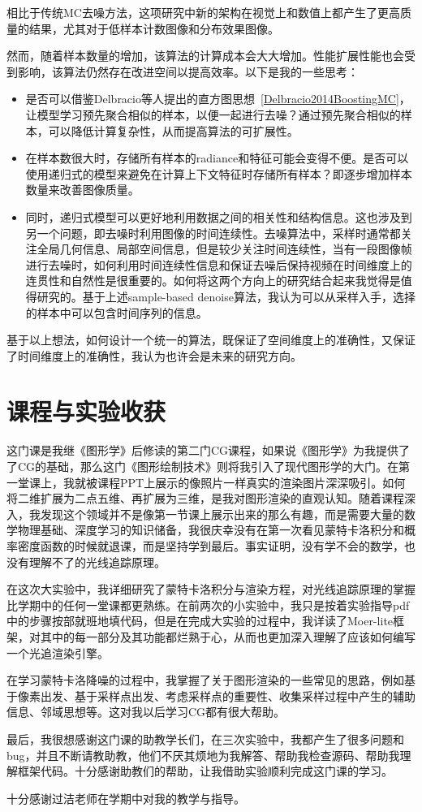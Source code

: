 \documentclass[lang=cn,10pt]{elegantbook}
\begin{document}
相比于传统MC去噪方法，这项研究中新的架构在视觉上和数值上都产生了更高质量的结果，尤其对于低样本计数图像和分布效果图像。

然而，随着样本数量的增加，该算法的计算成本会大大增加。性能扩展性能也会受到影响，该算法仍然存在改进空间以提高效率。以下是我的一些思考：

\begin{itemize}

\item 是否可以借鉴Delbracio等人提出的直方图思想~\ref{Delbracio2014BoostingMC}，让模型学习预先聚合相似的样本，以便一起进行去噪？通过预先聚合相似的样本，可以降低计算复杂性，从而提高算法的可扩展性。

\item 在样本数很大时，存储所有样本的radiance和特征可能会变得不便。是否可以使用递归式的模型来避免在计算上下文特征时存储所有样本？即逐步增加样本数量来改善图像质量。

\item 同时，递归式模型可以更好地利用数据之间的相关性和结构信息。这也涉及到另一个问题，即去噪时利用图像的时间连续性。去噪算法中，采样时通常都关注全局几何信息、局部空间信息，但是较少关注时间连续性，当有一段图像帧进行去噪时，如何利用时间连续性信息和保证去噪后保持视频在时间维度上的连贯性和自然性是很重要的。如何将这两个方向上的研究结合起来我觉得是值得研究的。基于上述sample-based denoise算法，我认为可以从采样入手，选择的样本中可以包含时间序列的信息。

\end{itemize}

\vspace{5pt}
基于以上想法，如何设计一个统一的算法，既保证了空间维度上的准确性，又保证了时间维度上的准确性，我认为也许会是未来的研究方向。


\chapter{课程与实验收获}
这门课是我继《图形学》后修读的第二门CG课程，如果说《图形学》为我提供了了CG的基础，那么这门《图形绘制技术》则将我引入了现代图形学的大门。在第一堂课上，我就被课程PPT上展示的像照片一样真实的渲染图片深深吸引。如何将二维扩展为二点五维、再扩展为三维，是我对图形渲染的直观认知。随着课程深入，我发现这个领域并不是像第一节课上展示出来的那么有趣，而是需要大量的数学物理基础、深度学习的知识储备，我很庆幸没有在第一次看见蒙特卡洛积分和概率密度函数的时候就退课，而是坚持学到最后。事实证明，没有学不会的数学，也没有理解不了的光线追踪原理。

在这次大实验中，我详细研究了蒙特卡洛积分与渲染方程，对光线追踪原理的掌握比学期中的任何一堂课都更熟练。在前两次的小实验中，我只是按着实验指导pdf中的步骤按部就班地填代码，但是在完成大实验的过程中，我详读了Moer-lite框架，对其中的每一部分及其功能都烂熟于心，从而也更加深入理解了应该如何编写一个光追渲染引擎。

在学习蒙特卡洛降噪的过程中，我掌握了关于图形渲染的一些常见的思路，例如基于像素出发、基于采样点出发、考虑采样点的重要性、收集采样过程中产生的辅助信息、邻域思想等。这对我以后学习CG都有很大帮助。

最后，我很想感谢这门课的助教学长们，在三次实验中，我都产生了很多问题和bug，并且不断请教助教，他们不厌其烦地为我解答、帮助我检查源码、帮助我理解框架代码。十分感谢助教们的帮助，让我借助实验顺利完成这门课的学习。

十分感谢过洁老师在学期中对我的教学与指导。


\nocite{*}
\printbibliography[heading=bibintoc, title=\ebibname]
\end{document}
